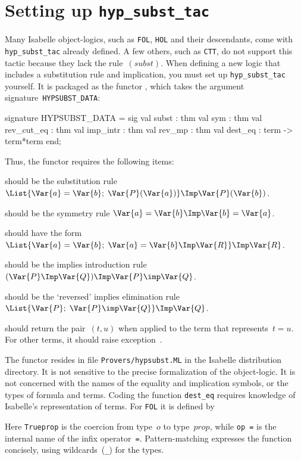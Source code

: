 \section{Setting up {\tt hyp_subst_tac}} 
Many Isabelle object-logics, such as {\tt FOL}, {\tt HOL} and their
descendants, come with {\tt hyp_subst_tac} already defined.  A few others,
such as {\tt CTT}, do not support this tactic because they lack the
rule~$(subst)$.  When defining a new logic that includes a substitution
rule and implication, you must set up {\tt hyp_subst_tac} yourself.  It
is packaged as the \ML{} functor , which takes the
argument signature~{\tt HYPSUBST_DATA}:
\begin{ttbox} 
signature HYPSUBST_DATA =
  sig
  val subst      : thm
  val sym        : thm
  val rev_cut_eq : thm
  val imp_intr   : thm
  val rev_mp     : thm
  val dest_eq    : term -> term*term
  end;
\end{ttbox}
Thus, the functor requires the following items:
\begin{ttdescription}
\item[\tdxbold{subst}] should be the substitution rule
$\List{\Var{a}=\Var{b};\; \Var{P}(\Var{a})} \Imp \Var{P}(\Var{b})$.

\item[\tdxbold{sym}] should be the symmetry rule
$\Var{a}=\Var{b}\Imp\Var{b}=\Var{a}$.

\item[\tdxbold{rev_cut_eq}] should have the form
$\List{\Var{a}=\Var{b};\; \Var{a}=\Var{b}\Imp\Var{R}} \Imp \Var{R}$.

\item[\tdxbold{imp_intr}] should be the implies introduction
rule $(\Var{P}\Imp\Var{Q})\Imp \Var{P}\imp\Var{Q}$.

\item[\tdxbold{rev_mp}] should be the `reversed' implies elimination
rule $\List{\Var{P};  \;\Var{P}\imp\Var{Q}} \Imp \Var{Q}$.

\item[\ttindexbold{dest_eq}] should return the pair~$(t,u)$ when
applied to the \ML{} term that represents~$t=u$.  For other terms, it
should raise exception~.
\end{ttdescription}
The functor resides in file {\tt Provers/hypsubst.ML} in the Isabelle
distribution directory.  It is not sensitive to the precise formalization
of the object-logic.  It is not concerned with the names of the equality
and implication symbols, or the types of formula and terms.  Coding the
function {\tt dest_eq} requires knowledge of Isabelle's representation of
terms.  For {\tt FOL} it is defined by
Here {\tt Trueprop} is the coercion from type~$o$ to type~$prop$, while
\hbox{\tt op =} is the internal name of the infix operator~{\tt=}.
Pattern-matching expresses the function concisely, using wildcards~({\tt_})
for the types.

